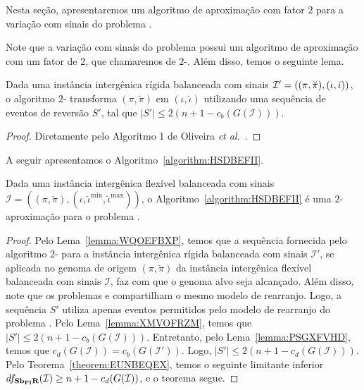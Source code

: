 Nesta seção, apresentaremos um algoritmo de aproximação com fator $2$ para a variação com sinais do problema \SbFIR{}. 

Note que a variação com sinais do problema \SbIR{} possui um algoritmo de aproximação com um fator de $2$, que chamaremos de $2$-\SbIR{}. Além disso, temos o seguinte lema.

\begin{lemma}\label{lemma:XMVOFRZM}
Dada uma instância intergênica rígida balanceada com sinais $\mathcal{I}'=((\pi,\breve\pi),\break(\iota,\breve\iota))$, o algoritmo $2$-\SbIR{} transforma $(\pi,\breve\pi)$ em $(\iota,\breve\iota)$ utilizando uma sequência de eventos de reversão $S'$, tal que $|S'| \le 2({n+1} - c_b(G(\mathcal{I})))$.
\end{lemma}
\begin{proof}
Diretamente pelo Algoritmo 1 de Oliveira \textit{et al.}~\cite{2021b-oliveira-etal}.
\end{proof}

A seguir apresentamos o Algoritmo~\ref{algorithm:HSDBEFII}.



\begin{theorem}\label{theorem:GTWKCOJR}
Dada uma instância intergênica flexível balanceada com sinais $\mathcal{I} = ((\pi,\breve\pi),(\iota,\breve\iota^{\min},\breve\iota^{\max}))$, o Algoritmo~\ref{algorithm:HSDBEFII} é uma $2$-aproximação para o problema \SbFIR{}.
\end{theorem}
\begin{proof}
Pelo Lema~\ref{lemma:WQOEFBXP}, temos que a sequência fornecida pelo algoritmo $2$-\SbIR{} para a instância intergênica rígida balanceada com sinais $\mathcal{I'}$, se aplicada no genoma de origem $(\pi,\breve\pi)$ da instância intergênica flexível balanceada com sinais $\mathcal{I}$, faz com que o genoma alvo seja alcançado. Além disso, note que os problemas \SbIR{} e \SbFIR{} compartilham o mesmo modelo de rearranjo. Logo, a sequência $S'$ utiliza apenas eventos permitidos pelo modelo de rearranjo do problema \SbFIR{}. Pelo Lema~\ref{lemma:XMVOFRZM}, temos que $|S'| \le 2({n+1} - c_b(G(\mathcal{I})))$. Entretanto, pelo Lema~\ref{lemma:PSGXFVHD}, temos que $c_d(G(\mathcal{I})) = c_b(G(\mathcal{I}'))$. Logo, $|S'| \le 2({n+1} - c_d(G(\mathcal{I})))$. Pelo Teorema~\ref{theorem:EUNBEQEX}, temos o seguinte limitante inferior $df_{\textbf{Sb\textsubscript{FI}R}}(\mathcal{I}) \ge {n+1} - c_d(G(\mathcal{I}))$, e o teorema segue.
\end{proof}

